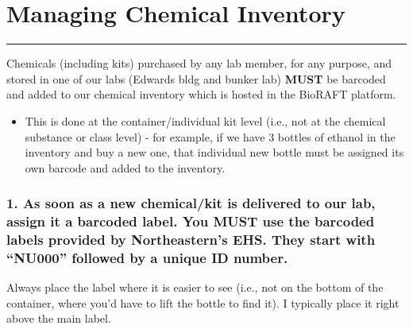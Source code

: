 \documentclass[
  letterpaper,
  DIV=11,
  numbers=noendperiod]{scrreprt}
\providecommand{\tightlist}{%
  \setlength{\itemsep}{0pt}\setlength{\parskip}{0pt}}\usepackage{longtable,booktabs,array}
\begin{document}
\hypertarget{managing-chemical-inventory}{%
\chapter{Managing Chemical
Inventory}\label{managing-chemical-inventory}}

\begin{center}\rule{0.5\linewidth}{0.5pt}\end{center}

Chemicals (including kits) purchased by any lab member, for any purpose,
and stored in one of our labs (Edwards bldg and bunker lab)
\textbf{MUST} be barcoded and added to our chemical inventory which is
hosted in the BioRAFT platform.

\begin{itemize}
\tightlist
\item
  This is done at the container/individual kit level (i.e., not at the
  chemical substance or class level) - for example, if we have 3 bottles
  of ethanol in the inventory and buy a new one, that individual new
  bottle must be assigned its own barcode and added to the inventory.
\end{itemize}

\hypertarget{as-soon-as-a-new-chemicalkit-is-delivered-to-our-lab-assign-it-a-barcoded-label.-you-must-use-the-barcoded-labels-provided-by-northeasterns-ehs.-they-start-with-nu000-followed-by-a-unique-id-number.}{%
\subsection*{\texorpdfstring{\textbf{1. As soon as a new chemical/kit is
delivered to our lab, assign it a barcoded label. You MUST use the
barcoded labels provided by Northeastern's EHS. They start with
``NU000'' followed by a unique ID
number.}}{1. As soon as a new chemical/kit is delivered to our lab, assign it a barcoded label. You MUST use the barcoded labels provided by Northeastern's EHS. They start with ``NU000'' followed by a unique ID number.}}\label{as-soon-as-a-new-chemicalkit-is-delivered-to-our-lab-assign-it-a-barcoded-label.-you-must-use-the-barcoded-labels-provided-by-northeasterns-ehs.-they-start-with-nu000-followed-by-a-unique-id-number.}}

Always place the label where it is easier to see (i.e., not on the
bottom of the container, where you'd have to lift the bottle to find
it). I typically place it right above the main label.
\end{document}
